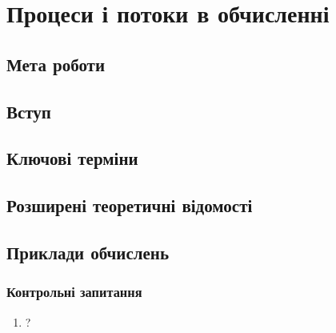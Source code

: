 \chapter{Процеси і потоки в обчисленні}
\nopagebreak[4]
\section*{Мета роботи}

\nopagebreak[4]
\section{Вступ}
\nopagebreak[4]


\section{Ключові терміни}
\nopagebreak[4]




\section{Розширені теоретичні відомості}
\nopagebreak[4]




\section{Приклади обчислень}
\nopagebreak[4]




\subsection*{Контрольні запитання}
\nopagebreak[4]
\begin{enumerate}
\item ?
\end{enumerate}



